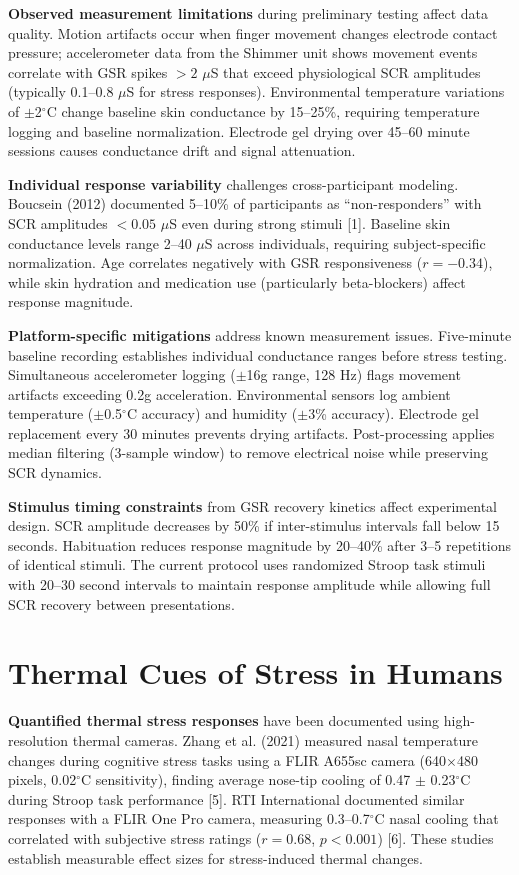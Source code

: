 \textbf{Observed measurement limitations} during preliminary testing affect data quality. Motion artifacts occur when finger movement changes electrode contact pressure; accelerometer data from the Shimmer unit shows movement events correlate with GSR spikes $>2$ $\mu$S that exceed physiological SCR amplitudes (typically 0.1--0.8 $\mu$S for stress responses). Environmental temperature variations of $\pm$2$^\circ$C change baseline skin conductance by 15--25\%, requiring temperature logging and baseline normalization. Electrode gel drying over 45--60 minute sessions causes conductance drift and signal attenuation.

\textbf{Individual response variability} challenges cross-participant modeling. Boucsein (2012) documented 5--10\% of participants as ``non-responders'' with SCR amplitudes $<0.05$ $\mu$S even during strong stimuli [1]. Baseline skin conductance levels range 2--40 $\mu$S across individuals, requiring subject-specific normalization. Age correlates negatively with GSR responsiveness ($r = -0.34$), while skin hydration and medication use (particularly beta-blockers) affect response magnitude.

\textbf{Platform-specific mitigations} address known measurement issues. Five-minute baseline recording establishes individual conductance ranges before stress testing. Simultaneous accelerometer logging ($\pm$16g range, 128 Hz) flags movement artifacts exceeding 0.2g acceleration. Environmental sensors log ambient temperature ($\pm$0.5$^\circ$C accuracy) and humidity ($\pm$3\% accuracy). Electrode gel replacement every 30 minutes prevents drying artifacts. Post-processing applies median filtering (3-sample window) to remove electrical noise while preserving SCR dynamics.

\textbf{Stimulus timing constraints} from GSR recovery kinetics affect experimental design. SCR amplitude decreases by 50\% if inter-stimulus intervals fall below 15 seconds. Habituation reduces response magnitude by 20--40\% after 3--5 repetitions of identical stimuli. The current protocol uses randomized Stroop task stimuli with 20--30 second intervals to maintain response amplitude while allowing full SCR recovery between presentations.

\section{Thermal Cues of Stress in Humans}
\textbf{Quantified thermal stress responses} have been documented using high-resolution thermal cameras. Zhang et al. (2021) measured nasal temperature changes during cognitive stress tasks using a FLIR A655sc camera (640$\times$480 pixels, 0.02$^\circ$C sensitivity), finding average nose-tip cooling of 0.47 $\pm$ 0.23$^\circ$C during Stroop task performance [5]. RTI International documented similar responses with a FLIR One Pro camera, measuring 0.3--0.7$^\circ$C nasal cooling that correlated with subjective stress ratings ($r = 0.68$, $p < 0.001$) [6]. These studies establish measurable effect sizes for stress-induced thermal changes.

